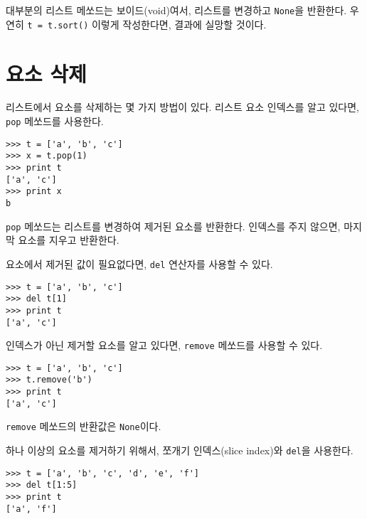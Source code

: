 대부분의 리스트 메쏘드는 보이드(void)여서, 리스트를 변경하고 {\tt None}을 반환한다.
우연히 {\tt t = t.sort()} 이렇게 작성한다면, 결과에 실망할 것이다.


\section{요소 삭제}


리스트에서 요소를 삭제하는 몇 가지 방법이 있다. 리스트 요소 인덱스를 알고 있다면, {\tt pop} 메쏘드를 사용한다.


\beforeverb
\begin{verbatim}
>>> t = ['a', 'b', 'c']
>>> x = t.pop(1)
>>> print t
['a', 'c']
>>> print x
b
\end{verbatim}
\afterverb
%

{\tt pop} 메쏘드는 리스트를 변경하여  제거된 요소를 반환한다.
인덱스를 주지 않으면, 마지막 요소를 지우고 반환한다.

요소에서 제거된 값이 필요없다면, {\tt del} 연산자를 사용할 수 있다.


\beforeverb
\begin{verbatim}
>>> t = ['a', 'b', 'c']
>>> del t[1]
>>> print t
['a', 'c']
\end{verbatim}
\afterverb
%

인덱스가 아닌 제거할 요소를 알고 있다면, {\tt remove} 메쏘드를 사용할 수 있다.


\beforeverb
\begin{verbatim}
>>> t = ['a', 'b', 'c']
>>> t.remove('b')
>>> print t
['a', 'c']
\end{verbatim}
\afterverb
%

{\tt remove} 메쏘드의 반환값은 {\tt None}이다.


하나 이상의 요소를 제거하기 위해서, 쪼개기 인덱스(slice index)와 {\tt del}을 사용한다.

\beforeverb
\begin{verbatim}
>>> t = ['a', 'b', 'c', 'd', 'e', 'f']
>>> del t[1:5]
>>> print t
['a', 'f']
\end{verbatim}
\afterverb
%

